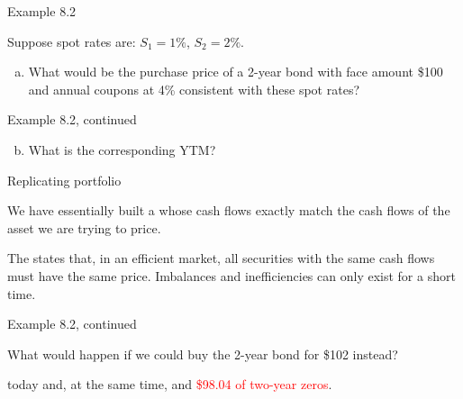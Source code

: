 \documentclass{beamer}
\begin{document}
\begin{frame}{Example 8.2}

Suppose spot rates are: $S_1 = 1\%$, $S_2 = 2\%$.

\begin{enumerate}[(a)]
\item What would be the purchase price of a 2-year bond with face amount \$100 and annual coupons at 4\% consistent with these spot rates?
\end{enumerate}

\begin{center}
\end{center}

\vfill
\end{frame}

\begin{frame}{Example 8.2, continued}

\begin{enumerate}[(a)]
\setcounter{enumi}{1}
\item What is the corresponding YTM?
\end{enumerate}

\vfill
\end{frame}

\begin{frame}{Replicating portfolio}

We have essentially built a  whose cash flows exactly match the cash flows of the asset we are trying to price.

\bigskip
The  states that, in an efficient market, all securities with the same cash flows must have the same price. Imbalances and inefficiencies can only exist for a short time.

\end{frame}

\begin{frame}{Example 8.2, continued}

What would happen if we could buy the 2-year bond for \$102 instead?

\medskip
{} today and, at the same time,  and \textcolor{red}{\$98.04 of two-year zeros}.

\begin{center}
\end{center}

\vfill
\end{frame}
\end{document}
